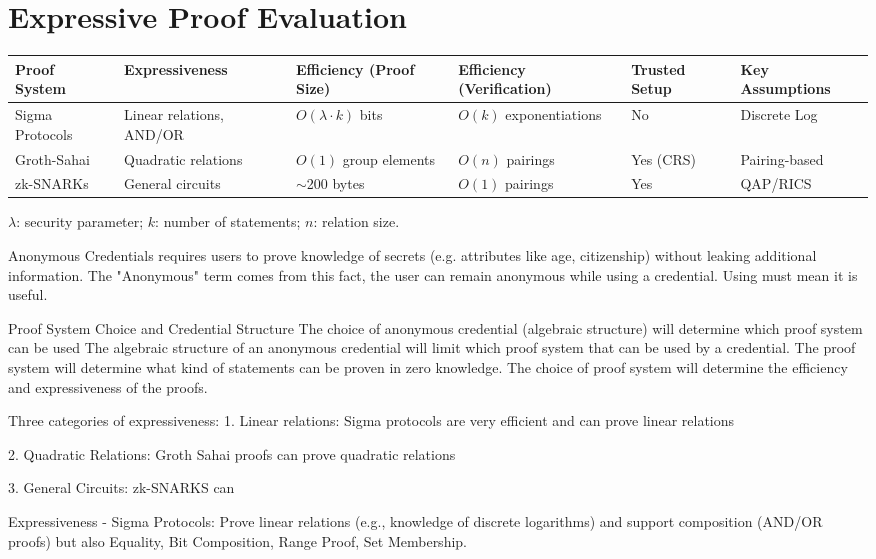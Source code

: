 \section{Expressive Proof Evaluation}\label{chap2:expressive_proofs}

\begin{tabular}{|p{2.5cm}|p{2.5cm}|p{3cm}|p{3cm}|p{2cm}|p{3cm}|}
\hline
\textbf{Proof System} & \textbf{Expressiveness} & \textbf{Efficiency (Proof Size)} & \textbf{Efficiency (Verification)} & \textbf{Trusted Setup} & \textbf{Key Assumptions} \\
\hline
Sigma Protocols & Linear relations, AND/OR & $O(\lambda \cdot k)$ bits & $O(k)$ exponentiations & No & Discrete Log \\
\hline
Groth-Sahai & Quadratic relations & $O(1)$ group elements & $O(n)$ pairings & Yes (CRS) & Pairing-based \\
\hline
zk-SNARKs & General circuits & $\sim$200 bytes & $O(1)$ pairings & Yes & QAP/RICS \\
\hline
\end{tabular}

\vspace{0.3cm}
\begin{center}
$\lambda$: security parameter; $k$: number of statements; $n$: relation size.
\end{center}

Anonymous Credentials requires users to prove knowledge of secrets (e.g. attributes like age, citizenship) without leaking additional information. The "Anonymous" term comes from this fact, the user can remain anonymous while using a credential. Using must mean it is useful.

Proof System Choice and Credential Structure
The choice of anonymous credential (algebraic structure) will determine which proof system can be used
The algebraic structure of an anonymous credential will limit which proof system that can be used by a credential. 
The proof system will determine what kind of statements can be proven in zero knowledge.
The choice of proof system will determine the efficiency and expressiveness of the proofs.


Three categories of expressiveness:
1. Linear relations: Sigma protocols are very efficient and can prove linear relations 

2. Quadratic Relations:  Groth Sahai proofs can prove quadratic relations

3. General Circuits: zk-SNARKS can 

Expressiveness
- Sigma Protocols: Prove linear relations (e.g., knowledge of discrete logarithms) and support composition (AND/OR proofs) but also Equality, Bit Composition, Range Proof, Set Membership.


